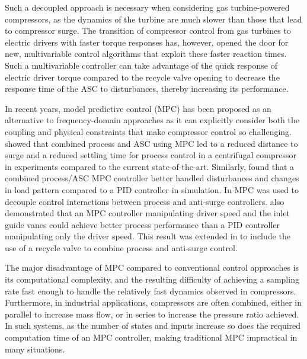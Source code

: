 Such a decoupled approach is necessary when considering gas turbine-powered compressors, as the dynamics of the turbine are much slower than those that lead to compressor surge.
The transition of compressor control from gas turbines to electric drivers with faster torque responses has, however, opened the door for new, multivariable control algorithms that exploit these faster reaction times.
Such a multivariable controller can take advantage of the quick response of electric driver torque compared to the recycle valve opening to decrease the response time of the ASC to disturbances, thereby increasing its performance.

In recent years, model predictive control (MPC) has been proposed as an alternative to frequency-domain approaches as it can explicitly consider both the coupling and physical constraints that make compressor control so challenging.
\cite{Cortinovis2015} showed that combined process and ASC using MPC led to a reduced distance to surge and a reduced settling time for process control in a centrifugal compressor in experiments compared to the current state-of-the-art.
Similarly, \cite{Budinis2015} found that a combined process/ASC MPC controller better handled disturbances and changes in load pattern compared to a PID controller in simulation.
In \cite{Mercangoz2016} MPC was used to decouple control interactions between process and anti-surge controllers.
\cite{Bentaleb2014} also demonstrated that an MPC controller manipulating driver speed and the inlet guide vanes could achieve better process performance than a PID controller manipulating only the driver speed.
This result was extended in \cite{Bentaleb2015} to include the use of a recycle valve to combine process and anti-surge control.

The major disadvantage of MPC compared to conventional control approaches is its computational complexity, and the resulting difficulty of achieving a sampling rate fast enough to handle the relatively fast dynamics observed in compressors.
Furthermore, in industrial applications, compressors are often combined, either in parallel to increase mass flow, or in series to increase the pressure ratio achieved.
In such systems, as the number of states and inputs increase so does the required computation time of an MPC controller, making traditional MPC impractical in many situations.

